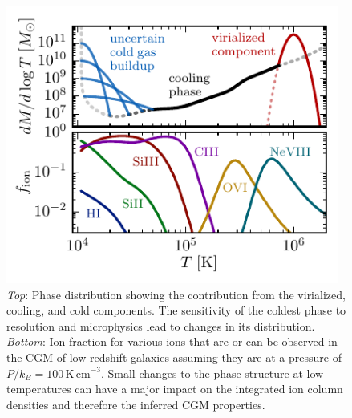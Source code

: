\documentclass[11pt,letterpaper,english]{article}
\begin{document}


\begin{figure}[h]
    \centering
    \begin{minipage}{0.6\textwidth}
        \includegraphics[width=0.975\textwidth]{../figures/dMdlogT_picture_ion_all_P100_broad_narrow_3in.pdf} 
    \end{minipage}\hfill
    \begin{minipage}{0.4\textwidth}
        \centering
\caption{\textit{Top}: Phase distribution showing the contribution from the virialized, cooling, and cold components. The sensitivity of the coldest phase to resolution and microphysics lead to changes in its distribution. \textit{Bottom}: Ion fraction for various ions that are or can be observed in the CGM of low redshift galaxies assuming they are at a pressure of $P/k_B = 100\,\mathrm{K\,cm}^{-3}$. Small changes to the phase structure at low temperatures can have a major impact on the integrated ion column densities and therefore the inferred CGM properties.\label{fig:multiphase}} 
\end{minipage}
\end{figure}
\end{document}
